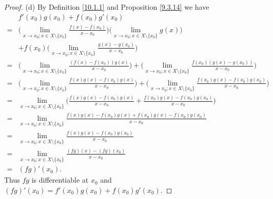 \begin{proof}{(d)}
    By Definition \ref{10.1.1} and Proposition \ref{9.3.14} we have
    \begin{align*}
          & f'(x_0) g(x_0) + f(x_0) g'(x_0)                                                                                                                                                                         \\
        = & \bigg(\lim_{x \to x_0 ; x \in X \setminus \{x_0\}} \frac{f(x) - f(x_0)}{x - x_0}\bigg) \bigg(\lim_{x \to x_0 ; x \in X \setminus \{x_0\}} g(x)\bigg)                                                    \\
          & + f(x_0) \bigg(\lim_{x \to x_0 ; x \in X \setminus \{x_0\}} \frac{g(x) - g(x_0)}{x - x_0}\bigg)                                                                                                         \\
        = & \bigg(\lim_{x \to x_0 ; x \in X \setminus \{x_0\}} \frac{(f(x) - f(x_0)) g(x)}{x - x_0}\bigg) + \bigg(\lim_{x \to x_0 ; x \in X \setminus \{x_0\}} \frac{f(x_0) (g(x) - g(x_0))}{x - x_0}\bigg)         \\
        = & \bigg(\lim_{x \to x_0 ; x \in X \setminus \{x_0\}} \frac{f(x) g(x) - f(x_0) g(x)}{x - x_0}\bigg) + \bigg(\lim_{x \to x_0 ; x \in X \setminus \{x_0\}} \frac{f(x_0) g(x) - f(x_0) g(x_0)}{x - x_0}\bigg) \\
        = & \lim_{x \to x_0 ; x \in X \setminus \{x_0\}} \bigg(\frac{f(x) g(x) - f(x_0) g(x)}{x - x_0} + \frac{f(x_0) g(x) - f(x_0) g(x_0)}{x - x_0}\bigg)                                                          \\
        = & \lim_{x \to x_0 ; x \in X \setminus \{x_0\}} \frac{f(x) g(x) - f(x_0) g(x) + f(x_0) g(x) - f(x_0) g(x_0)}{x - x_0}                                                                                      \\
        = & \lim_{x \to x_0 ; x \in X \setminus \{x_0\}} \frac{f(x) g(x) - f(x_0) g(x_0)}{x - x_0}                                                                                                                  \\
        = & \lim_{x \to x_0 ; x \in X \setminus \{x_0\}} \frac{(fg)(x) - (fg)(x_0)}{x - x_0}                                                                                                                        \\
        = & (fg)'(x_0).
    \end{align*}
    Thus \(fg\) is differentiable at \(x_0\) and \((fg)'(x_0) = f'(x_0) g(x_0) + f(x_0) g'(x_0)\).
\end{proof}

